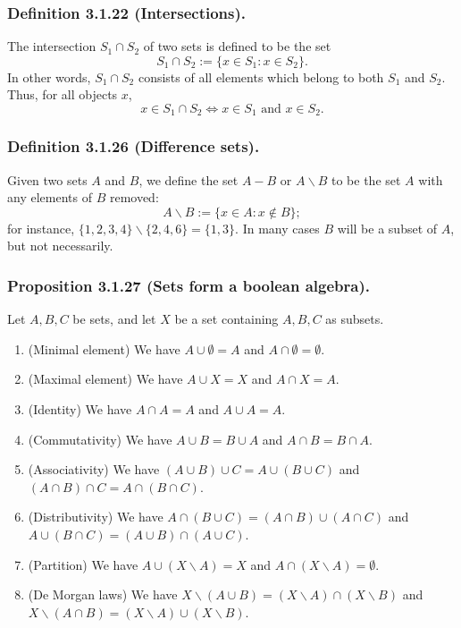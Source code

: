 \documentclass[12pt, letter]{article}
\begin{document}
\subsubsection*{Definition 3.1.22 (Intersections).}
The intersection $S_1\cap S_2$ of two sets is defined to be the set 
\begin{equation*}
    S_1\cap S_2:=\{x\in S_1:x\in S_2\}.
\end{equation*}
In other words, $S_1\cap S_2$ consists of all elements which belong to both $S_1$ and $S_2$. Thus, for all objects $x$,
\begin{equation*}
    x\in S_1\cap S_2\iff x\in S_1\text{ and }x\in S_2.
\end{equation*}
\subsubsection*{Definition 3.1.26 (Difference sets).} 
Given two sets $A$ and $B$, we define the set $A-B$ or $A\backslash B$ to be the set $A$ with any elements of $B$ removed:
\begin{equation*}
    A\backslash B:=\{x\in A: x\notin B\};
\end{equation*} 
for instance, $\{1,2,3,4\}\backslash\{2,4,6\}=\{1,3\}$. In many cases $B$ will be a subset of $A$, but not necessarily.
\subsubsection*{Proposition 3.1.27 (Sets form a boolean algebra).}
Let $A,B,C$ be sets, and let $X$ be a set containing $A,B,C$ as subsets.
\begin{enumerate}
    \item (Minimal element) We have $A\cup\emptyset=A$ and $A\cap\emptyset=\emptyset$.
    \item (Maximal element) We have $A\cup X=X$ and $A\cap X=A$.
    \item (Identity) We have $A\cap A=A$ and $A\cup A=A$.
    \item (Commutativity) We have $A\cup B=B\cup A$ and $A\cap B=B\cap A$.
    \item (Associativity) We have $(A\cup B)\cup C=A\cup(B\cup C)$ and $(A\cap B)\cap C=A\cap(B\cap C)$.
    \item (Distributivity) We have $A\cap (B\cup C)=(A\cap B)\cup (A\cap C)$ and $A\cup(B\cap C)=(A\cup B)\cap (A\cup C)$.
    \item (Partition) We have $A\cup(X\backslash A)=X$ and $A\cap (X\backslash A)=\emptyset$.
    \item (De Morgan laws) We have $X\backslash (A\cup B)=(X\backslash A)\cap (X\backslash B)$ and $X\backslash (A\cap B)=(X\backslash A)\cup(X\backslash B)$. 
\end{enumerate}
\end{document}
